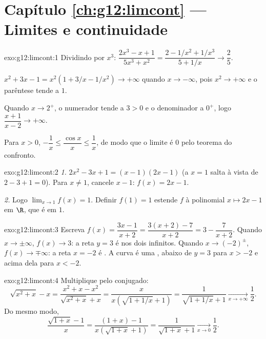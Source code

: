 \section*{Capítulo \ref{ch:g12:limcont} --- Limites e continuidade}

\begin{solution}{exo:g12:limcont:1}
Dividindo por $x^3$:
$\dfrac{2x^3 - x + 1}{5x^3 + x^2} = \dfrac{2 - 1/x^2 + 1/x^3}{5 + 1/x}
\to \dfrac{2}{5}$.

$x^2 + 3x - 1 = x^2(1 + 3/x - 1/x^2) \to +\infty$ quando
$x \to -\infty$, pois $x^2 \to +\infty$ e o parêntese tende a $1$.

Quando $x \to 2^+$, o numerador tende a $3 > 0$ e o denominador a $0^+$,
logo $\dfrac{x+1}{x-2} \to +\infty$.

Para $x > 0$, $-\dfrac1x \leq \dfrac{\cos x}{x} \leq \dfrac1x$, de modo
que o limite é $0$ pelo teorema do confronto.
\end{solution}

\begin{solution}{exo:g12:limcont:2}
\emph{1.} $2x^2 - 3x + 1 = (x-1)(2x-1)$ (a  $x=1$ salta à vista de
$2 - 3 + 1 = 0$). Para $x \neq 1$, cancele $x - 1$: $f(x) = 2x - 1$.

\emph{2.} Logo $\lim_{x\to1} f(x) = 1$. Definir $f(1) = 1$ estende $f$ à
 polinomial $x \mapsto 2x-1$ em $\R$, que é  em $1$.
\end{solution}

\begin{solution}{exo:g12:limcont:3}
Escreva $f(x) = \dfrac{3x - 1}{x + 2} = \dfrac{3(x+2) - 7}{x+2}
= 3 - \dfrac{7}{x+2}$. Quando $x \to \pm\infty$, $f(x) \to 3$: a reta
$y = 3$ é  nos dois infinitos. Quando
$x \to (-2)^\pm$, $f(x) \to \mp\infty$: a reta $x = -2$ é . A curva é uma , abaixo de $y=3$ para $x > -2$ e acima
dela para $x < -2$.
\end{solution}

\begin{solution}{exo:g12:limcont:4}
Multiplique pelo conjugado:
\[
\sqrt{x^2 + x} - x = \frac{x^2 + x - x^2}{\sqrt{x^2+x} + x}
= \frac{x}{x\left(\sqrt{1 + 1/x} + 1\right)}
= \frac{1}{\sqrt{1 + 1/x} + 1}
\xrightarrow[x\to+\infty]{} \frac{1}{2}.
\]
Do mesmo modo,
\[
\frac{\sqrt{1+x} - 1}{x} = \frac{(1+x) - 1}{x\left(\sqrt{1+x} + 1\right)}
= \frac{1}{\sqrt{1+x} + 1} \xrightarrow[x\to0]{} \frac{1}{2}.
\]
\end{solution}

